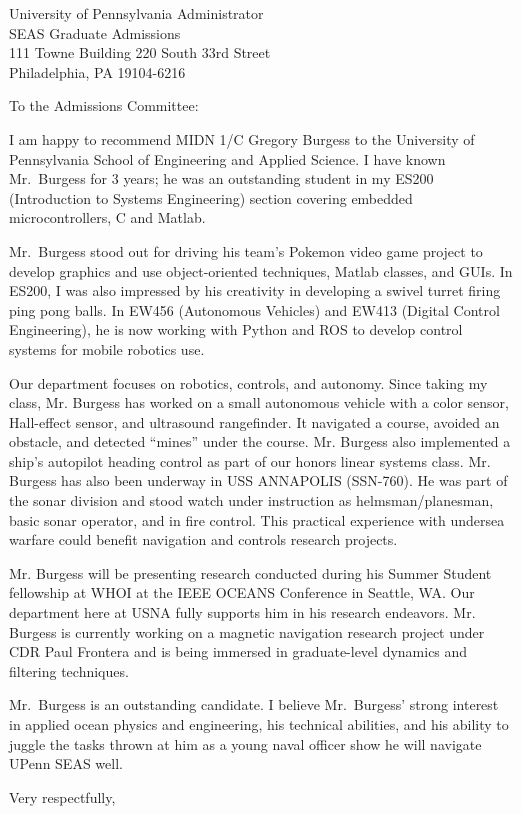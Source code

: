 \documentclass[11pt]{wrceletter}
\date{\today}
\begin{document}
\begin{letter}{%
University of Pennsylvania Administrator\\
SEAS Graduate Admissions\\
111 Towne Building 220 South 33rd Street\\
Philadelphia, PA 19104-6216}

\opening{To the Admissions Committee:}
\raggedright %
\setlength{\parindent}{15pt} %

I am happy to recommend MIDN 1/C Gregory Burgess to the University of Pennsylvania School of Engineering and Applied Science. I have known Mr.~Burgess for 3 years; he was an outstanding student in my ES200 (Introduction to Systems Engineering) section covering embedded microcontrollers, C and Matlab. 

Mr.~Burgess stood out for driving his team's Pokemon video game project to develop graphics and use object-oriented techniques, Matlab classes, and GUIs. In ES200, I was also impressed by his creativity in developing a swivel turret firing ping pong balls. In EW456 (Autonomous Vehicles) and EW413 (Digital Control Engineering), he is now working with Python and ROS to develop control systems for mobile robotics use.

Our department focuses on robotics, controls, and autonomy. Since taking my class, Mr. Burgess has worked on a small autonomous vehicle with a color sensor, Hall-effect sensor, and ultrasound rangefinder. It navigated a course, avoided an obstacle, and detected ``mines'' under the course. Mr. Burgess also implemented a ship’s autopilot heading control as part of our honors linear systems class. Mr. Burgess has also been underway in USS ANNAPOLIS (SSN-760). He was part of the sonar division and stood watch under instruction as helmsman/planesman, basic sonar operator, and in fire control. This practical experience with undersea warfare could benefit navigation and controls research projects.

Mr. Burgess will be presenting research conducted during his Summer Student fellowship at WHOI at the IEEE OCEANS Conference in Seattle, WA. Our department here at USNA fully supports him in his research endeavors. Mr. Burgess is currently working on a magnetic navigation research project under CDR Paul Frontera and is being immersed in graduate-level dynamics and filtering techniques. 

Mr.~Burgess is an outstanding candidate. I believe Mr.~Burgess' strong interest in applied ocean physics and engineering, his technical abilities, and his ability to juggle the tasks thrown at him as a young naval officer show he will navigate UPenn SEAS well. 

\closing{Very respectfully,} %

\end{letter}
\end{document}
